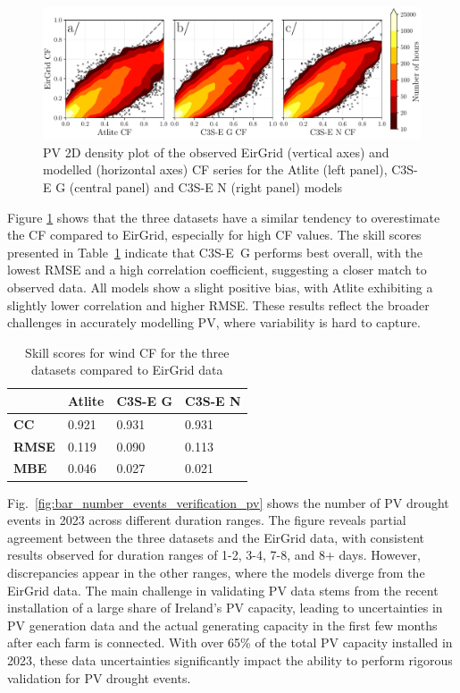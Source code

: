 \documentclass[a4paper, 11pt]{article}
\begin{document}
\begin{figure}[h!]
	\centering
	\includegraphics[width=\textwidth]{verification_pv_contour}
	\caption{PV 2D density plot of the observed EirGrid (vertical axes) and modelled (horizontal axes) CF series for the Atlite  (left panel), C3S-E G (central panel) and C3S-E N (right panel) models}	
	\label{fig:solar_verification_contour}
\end{figure}

Figure \ref{fig:solar_verification_contour} shows that the three datasets have a similar tendency to overestimate the CF compared to EirGrid, especially for high CF values. The skill scores presented in Table~\ref{tab:pv_skill_scores} indicate that C3S-E~G performs best overall, with the lowest RMSE and a high correlation coefficient, suggesting a closer match to observed data. All models show a slight positive bias, with Atlite exhibiting a slightly lower correlation and higher RMSE. These results reflect the broader challenges in accurately modelling PV, where variability is hard to capture.

\begin{table}[!ht]
	\centering
	\begin{tabular}{l|lll|}
	\cline{2-4}
	& \textbf{Atlite} & \textbf{C3S-E G} & \textbf{C3S-E N} \\ \hline
	\multicolumn{1}{|l|}{\textbf{CC}}   & 0.921           & 0.931            & 0.931            \\ \hline
	\multicolumn{1}{|l|}{\textbf{RMSE}} & 0.119           & 0.090            & 0.113            \\ \hline
	\multicolumn{1}{|l|}{\textbf{MBE}}   & 0.046           & 0.027           & 0.021           \\ \hline
	\end{tabular}
	\caption{Skill scores for wind CF for the three datasets compared to EirGrid data}
	\label{tab:pv_skill_scores}
\end{table}

Fig.~\ref{fig:bar_number_events_verification_pv} shows the number of PV drought events in 2023 across different duration ranges. The figure reveals partial agreement between the three datasets and the EirGrid data, with consistent results observed for duration ranges of 1-2, 3-4, 7-8, and 8+ days. However, discrepancies appear in the other ranges, where the models diverge from the EirGrid data. The main challenge in validating PV data stems from the recent installation of a large share of Ireland’s PV capacity, leading to uncertainties in PV generation data and the actual generating capacity in the first few months after each farm is connected. With over 65\% of the total PV capacity installed in 2023, these data uncertainties significantly impact the ability to perform rigorous validation for PV drought events.
\end{document}
